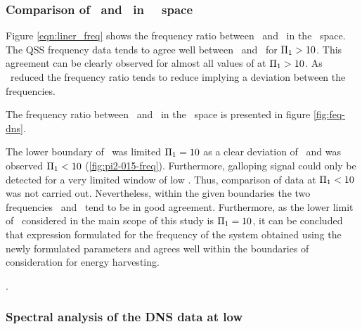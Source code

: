 \subsubsection{Comparison of \freqlin\ and \freqqss\ in \massstiff\ \massdamp\ space}

Figure \ref{eqn:liner_freq} shows the frequency ratio between \freqlin\ and \freqqss\ in the \massstiff\ \massdamp space. The QSS frequency data tends to agree well between \freqlin\ and \freqqss\ for $\Pi_1>10$. This agreement can be clearly observed for almost all values of \massdamp at $\Pi_1>10$. As \massstiff\ reduced the frequency ratio tends to reduce implying a deviation between the frequencies. 



The frequency ratio between \freqlin\ and \freqdns\ in the \massstiff\ \massdamp space is presented in figure \ref{fig:feq-dns}. 



The lower boundary of \massstiff\ was limited $\Pi_1=10$ as a clear deviation of \freqlin\ and \freqdns was observed $\Pi_1<10$ (\ref{fig:pi2-015-freq}). Furthermore, galloping signal could only be detected for a very limited window of low \massdamp. Thus, comparison of data at $\Pi_1<10$ was not carried out. Nevertheless, within the given boundaries the two frequencies \freqlin\ and \freqdns\ tend to be in good agreement. Furthermore, as the lower limit of \massstiff\ considered in the main scope of this study is $\Pi_1=10$, it can be concluded that expression formulated for the frequency of the system obtained using the newly formulated parameters \massstiff and \massdamp agrees well within the boundaries of consideration for energy harvesting.   
	

. %
\subsubsection{Spectral analysis of the DNS data at low \massstiff}



